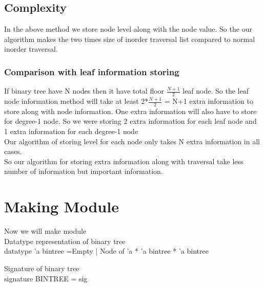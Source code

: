 \documentclass[10pt,a4paper]{article}%
\begin{document}
\subsection{Complexity}
In the above method we store node level along with the node value. So the our algorithm makes the two times size of inorder traversal list compared to normal inorder traversal.\\
\subsubsection{Comparison with leaf information storing}
If binary tree have N nodes then it have total floor \( \frac{N+1}{2} \) leaf node. So the leaf node information method will take at least 2*\( \frac{N+1}{2} \) = N+1 extra information to store along with node information. One extra information will also have to store for degree-1 node. So we were storing 2 extra information for each leaf node and 1 extra information for each degree-1 node\\
Our algorithm of storing level for each node only takes N extra information in all cases.\\
So our algorithm for storing extra information along with traversal take less number of information but important information.

\section{Making Module}
Now we will make module\\
Datatype representation of binary tree\\
\nwenddocs{}\endmoddef\nwstartdeflinemarkup{}\nwenddeflinemarkup
datatype 'a bintree =Empty |
        Node of 'a * 'a bintree * 'a bintree
\nwendcode{}\nwdocspar

Signature of binary tree\\
\nwenddocs{}\endmoddef\nwstartdeflinemarkup{}\nwenddeflinemarkup
signature BINTREE =
        sig
                
\end{document}
